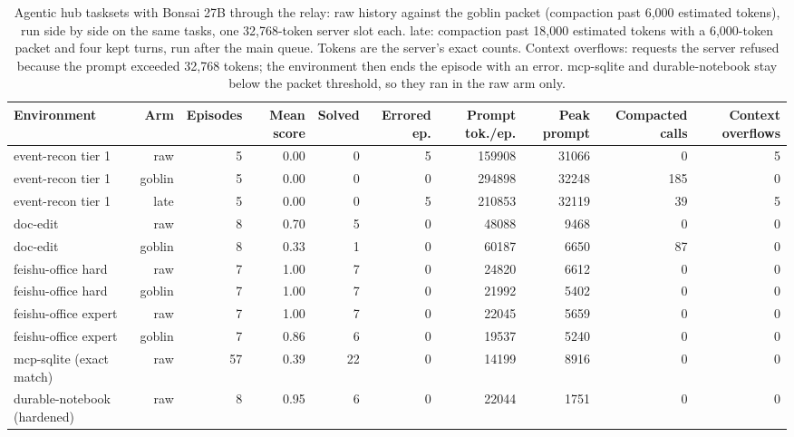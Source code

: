 \begin{table}[t]
\centering
\small
\begin{adjustbox}{max width=\linewidth}
\begin{tabular}{lrrrrrrrrr}
\toprule
Environment & Arm & Episodes & Mean score & Solved & Errored ep. & Prompt tok./ep. & Peak prompt & Compacted calls & Context overflows \\
\midrule
event-recon tier 1 & raw & 5 & 0.00 & 0 & 5 & 159908 & 31066 & 0 & 5 \\
event-recon tier 1 & goblin & 5 & 0.00 & 0 & 0 & 294898 & 32248 & 185 & 0 \\
event-recon tier 1 & late & 5 & 0.00 & 0 & 5 & 210853 & 32119 & 39 & 5 \\
doc-edit & raw & 8 & 0.70 & 5 & 0 & 48088 & 9468 & 0 & 0 \\
doc-edit & goblin & 8 & 0.33 & 1 & 0 & 60187 & 6650 & 87 & 0 \\
feishu-office hard & raw & 7 & 1.00 & 7 & 0 & 24820 & 6612 & 0 & 0 \\
feishu-office hard & goblin & 7 & 1.00 & 7 & 0 & 21992 & 5402 & 0 & 0 \\
feishu-office expert & raw & 7 & 1.00 & 7 & 0 & 22045 & 5659 & 0 & 0 \\
feishu-office expert & goblin & 7 & 0.86 & 6 & 0 & 19537 & 5240 & 0 & 0 \\
mcp-sqlite (exact match) & raw & 57 & 0.39 & 22 & 0 & 14199 & 8916 & 0 & 0 \\
durable-notebook (hardened) & raw & 8 & 0.95 & 6 & 0 & 22044 & 1751 & 0 & 0 \\
\bottomrule
\end{tabular}
\end{adjustbox}
\caption{Agentic hub tasksets with Bonsai 27B through the relay: raw history against the goblin packet (compaction past 6,000 estimated tokens), run side by side on the same tasks, one 32,768-token server slot each. late: compaction past 18,000 estimated tokens with a 6,000-token packet and four kept turns, run after the main queue. Tokens are the server's exact counts. Context overflows: requests the server refused because the prompt exceeded 32,768 tokens; the environment then ends the episode with an error. mcp-sqlite and durable-notebook stay below the packet threshold, so they ran in the raw arm only.}
\label{tab:hub-agentic}
\end{table}
